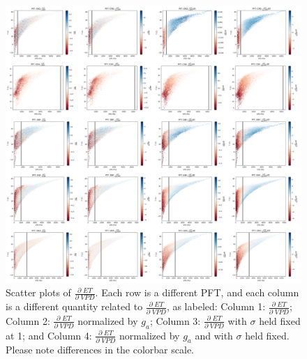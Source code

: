 \documentclass[draft,linenumbers]{agujournal}
\begin{document}
\begin{figure}[h]
\centering
\centerline{\includegraphics[width=1.4\textwidth]{./fig06.png}}
\caption{Scatter plots of $\frac{\partial \; ET}{\partial \; VPD}$. Each row is a different PFT, and each column is a different quantity related to $\frac{\partial \; ET}{\partial \; VPD}$, as labeled: Column 1: $\frac{\partial \; ET}{\partial \; VPD}$; Column 2: $\frac{\partial \; ET}{\partial \; VPD}$ normalized by $g_a$; Column 3: $\frac{\partial \; ET}{\partial \; VPD}$ with $\sigma$ held fixed at 1; and Column 4: $\frac{\partial \; ET}{\partial \; VPD}$ normalized by $g_a$ and with $\sigma$ held fixed. Please note differences in the colorbar scale.}
\label{real}
\end{figure}

\end{document}
